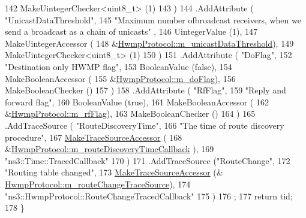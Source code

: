 \begin{DoxyCode}
142                     MakeUintegerChecker<uint8\_t> (1)
143                     )
144     .AddAttribute ( \textcolor{stringliteral}{"UnicastDataThreshold"},
145                     \textcolor{stringliteral}{"Maximum number ofbroadcast receivers, when we send a broadcast as a chain of unicasts"}
      ,
146                     UintegerValue (1),
147                     MakeUintegerAccessor (
148                       &\hyperlink{classns3_1_1dot11s_1_1HwmpProtocol_a1306d9f72e6800618a039c0a681166ad}{HwmpProtocol::m\_unicastDataThreshold}),
149                     MakeUintegerChecker<uint8\_t> (1)
150                     )
151     .AddAttribute ( \textcolor{stringliteral}{"DoFlag"},
152                     \textcolor{stringliteral}{"Destination only HWMP flag"},
153                     BooleanValue (\textcolor{keyword}{false}),
154                     MakeBooleanAccessor (
155                       &\hyperlink{classns3_1_1dot11s_1_1HwmpProtocol_abc04d85e45d9f1584d143bb81b8e1b8f}{HwmpProtocol::m\_doFlag}),
156                     MakeBooleanChecker ()
157                     )
158     .AddAttribute ( \textcolor{stringliteral}{"RfFlag"},
159                     \textcolor{stringliteral}{"Reply and forward flag"},
160                     BooleanValue (\textcolor{keyword}{true}),
161                     MakeBooleanAccessor (
162                       &\hyperlink{classns3_1_1dot11s_1_1HwmpProtocol_a8b777951609e6dc5af0f56275c964ad5}{HwmpProtocol::m\_rfFlag}),
163                     MakeBooleanChecker ()
164                     )
165     .AddTraceSource ( \textcolor{stringliteral}{"RouteDiscoveryTime"},
166                       \textcolor{stringliteral}{"The time of route discovery procedure"},
167                       \hyperlink{group__tracing_gab21a770b9855af4e8f69f7531ea4a6b0}{MakeTraceSourceAccessor} (
168                         &\hyperlink{classns3_1_1dot11s_1_1HwmpProtocol_a748b1b4837d4ec8e76852a6c450d2f4e}{HwmpProtocol::m\_routeDiscoveryTimeCallback}
      ),
169                       \textcolor{stringliteral}{"ns3::Time::TracedCallback"}
170                       )
171     .AddTraceSource (\textcolor{stringliteral}{"RouteChange"},
172                      \textcolor{stringliteral}{"Routing table changed"},
173                      \hyperlink{group__tracing_gab21a770b9855af4e8f69f7531ea4a6b0}{MakeTraceSourceAccessor} (&
      \hyperlink{classns3_1_1dot11s_1_1HwmpProtocol_aff5ca87b57430809a6b6ee25fa526948}{HwmpProtocol::m\_routeChangeTraceSource}),
174                      \textcolor{stringliteral}{"ns3::HwmpProtocol::RouteChangeTracedCallback"}
175                      )
176   ;
177   \textcolor{keywordflow}{return} tid;
178 \}
\end{DoxyCode}


